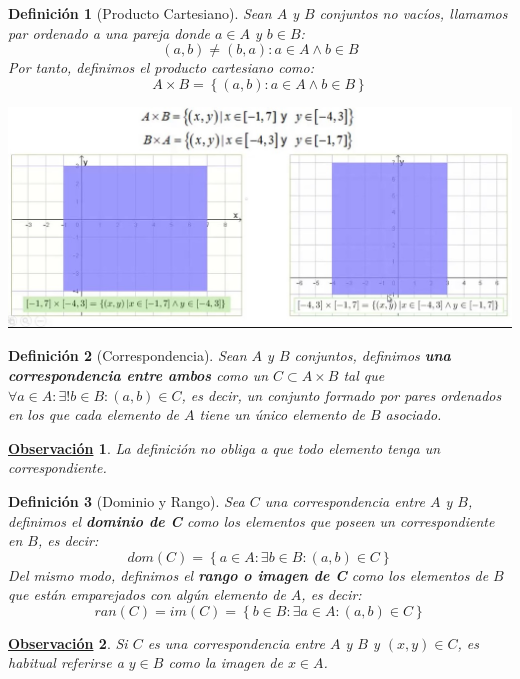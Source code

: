 \documentclass[10pt,a4paper,openright]{book}
\theoremstyle{break}
\newtheorem{defi}{Definición}[chapter]
\newtheorem{obs}{\underline{Observación}}[chapter]
\begin{document}
\begin{defi}[Producto Cartesiano]
Sean $A$ y $B$ conjuntos no vacíos, llamamos par ordenado a una pareja donde $a \in A$ y $b \in B$:
$$(a,b)\neq (b,a) : a\in A \wedge b\in B$$
Por tanto, definimos el producto cartesiano como:
$$A\times B=\left\lbrace (a,b) : a \in A \wedge b \in B\right\rbrace$$
\begin{center}
\includegraphics[scale=0.5]{producto cartesiano}
\end{center}
\end{defi}
 
\begin{defi}[Correspondencia]
Sean $A$ y $B$ conjuntos, definimos \textbf{una correspondencia entre ambos} como un $C\subset A \times B$ tal que $\forall a \in A : \exists! b \in B : (a,b)\in C$, es decir, un conjunto formado por pares ordenados en los que cada elemento de $A$ tiene un único elemento de $B$ asociado.
\end{defi}

\begin{obs}
La definición no obliga a que todo elemento tenga un correspondiente.
\end{obs}

\begin{defi}[Dominio y Rango]
Sea $C$ una correspondencia entre $A$ y $B$, definimos el \textbf{dominio de C} como los elementos que poseen un correspondiente en $B$, es decir:
$$dom(C)=\left\lbrace a\in A : \exists b \in B : (a,b)\in C\right\rbrace$$
Del mismo modo,  definimos el \textbf{rango o imagen de C} como los elementos de $B$ que están emparejados con algún elemento de $A$, es decir:
$$ran(C)=im(C)=\left\lbrace b\in B : \exists a \in A : (a,b)\in C\right\rbrace$$
\end{defi}

\begin{obs}
Si $C$ es una correspondencia entre $A$ y $B$ y $(x,y)\in C$, es habitual referirse a $y\in B$ como la imagen de $x \in A$. 
\end{obs}
\end{document}
